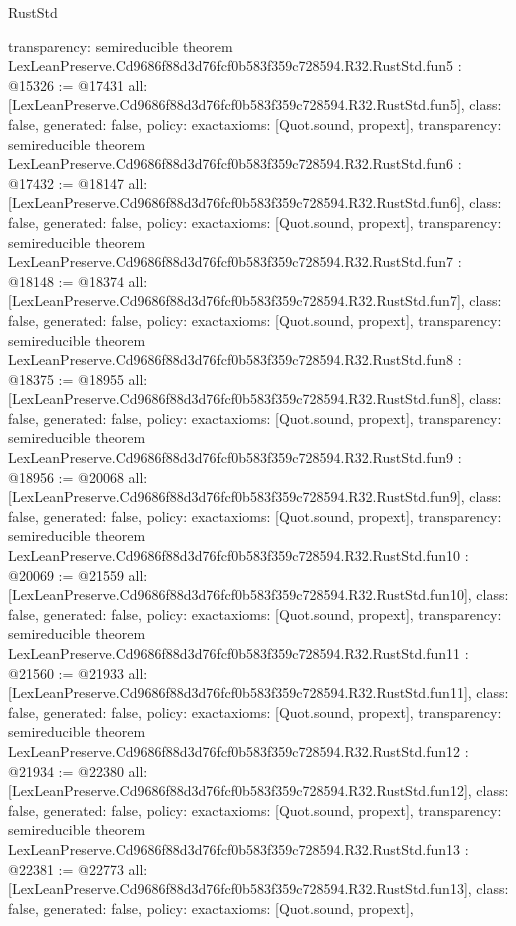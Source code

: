 \begin{lexlean}{RustStd}
\begin{coremodule}
{  transparency: semireducible
}
theorem LexLeanPreserve.Cd9686f88d3d76fcf0b583f359c728594.R32.RustStd.fun5 : @15326 := @17431 {
  all: [LexLeanPreserve.Cd9686f88d3d76fcf0b583f359c728594.R32.RustStd.fun5],
  class: false,
  generated: false,
  policy: exact{axioms: [Quot.sound, propext]},
  transparency: semireducible
}
theorem LexLeanPreserve.Cd9686f88d3d76fcf0b583f359c728594.R32.RustStd.fun6 : @17432 := @18147 {
  all: [LexLeanPreserve.Cd9686f88d3d76fcf0b583f359c728594.R32.RustStd.fun6],
  class: false,
  generated: false,
  policy: exact{axioms: [Quot.sound, propext]},
  transparency: semireducible
}
theorem LexLeanPreserve.Cd9686f88d3d76fcf0b583f359c728594.R32.RustStd.fun7 : @18148 := @18374 {
  all: [LexLeanPreserve.Cd9686f88d3d76fcf0b583f359c728594.R32.RustStd.fun7],
  class: false,
  generated: false,
  policy: exact{axioms: [Quot.sound, propext]},
  transparency: semireducible
}
theorem LexLeanPreserve.Cd9686f88d3d76fcf0b583f359c728594.R32.RustStd.fun8 : @18375 := @18955 {
  all: [LexLeanPreserve.Cd9686f88d3d76fcf0b583f359c728594.R32.RustStd.fun8],
  class: false,
  generated: false,
  policy: exact{axioms: [Quot.sound, propext]},
  transparency: semireducible
}
theorem LexLeanPreserve.Cd9686f88d3d76fcf0b583f359c728594.R32.RustStd.fun9 : @18956 := @20068 {
  all: [LexLeanPreserve.Cd9686f88d3d76fcf0b583f359c728594.R32.RustStd.fun9],
  class: false,
  generated: false,
  policy: exact{axioms: [Quot.sound, propext]},
  transparency: semireducible
}
theorem LexLeanPreserve.Cd9686f88d3d76fcf0b583f359c728594.R32.RustStd.fun10 : @20069 := @21559 {
  all: [LexLeanPreserve.Cd9686f88d3d76fcf0b583f359c728594.R32.RustStd.fun10],
  class: false,
  generated: false,
  policy: exact{axioms: [Quot.sound, propext]},
  transparency: semireducible
}
theorem LexLeanPreserve.Cd9686f88d3d76fcf0b583f359c728594.R32.RustStd.fun11 : @21560 := @21933 {
  all: [LexLeanPreserve.Cd9686f88d3d76fcf0b583f359c728594.R32.RustStd.fun11],
  class: false,
  generated: false,
  policy: exact{axioms: [Quot.sound, propext]},
  transparency: semireducible
}
theorem LexLeanPreserve.Cd9686f88d3d76fcf0b583f359c728594.R32.RustStd.fun12 : @21934 := @22380 {
  all: [LexLeanPreserve.Cd9686f88d3d76fcf0b583f359c728594.R32.RustStd.fun12],
  class: false,
  generated: false,
  policy: exact{axioms: [Quot.sound, propext]},
  transparency: semireducible
}
theorem LexLeanPreserve.Cd9686f88d3d76fcf0b583f359c728594.R32.RustStd.fun13 : @22381 := @22773 {
  all: [LexLeanPreserve.Cd9686f88d3d76fcf0b583f359c728594.R32.RustStd.fun13],
  class: false,
  generated: false,
  policy: exact{axioms: [Quot.sound, propext]},
}
\end{coremodule}
\end{lexlean}
